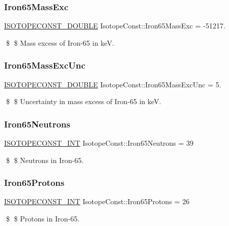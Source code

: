 \subsubsection{\texorpdfstring{Iron65\+Mass\+Exc}{Iron65MassExc}}
{\footnotesize\ttfamily \mbox{\hyperlink{group___isotope_const-_macros_ga8f45a7272ce02c0b4c65c44636ed719a}{I\+S\+O\+T\+O\+P\+E\+C\+O\+N\+S\+T\+\_\+\+D\+O\+U\+B\+LE}} Isotope\+Const\+::\+Iron65\+Mass\+Exc = -\/51217.}

\$ \$ Mass excess of Iron-\/65 in keV. \mbox{\label{group___isotope_const-_iron-_fe65_ga433e1e21e941b3355f8ce57d3cc3d229}} 
\subsubsection{\texorpdfstring{Iron65\+Mass\+Exc\+Unc}{Iron65MassExcUnc}}
{\footnotesize\ttfamily \mbox{\hyperlink{group___isotope_const-_macros_ga8f45a7272ce02c0b4c65c44636ed719a}{I\+S\+O\+T\+O\+P\+E\+C\+O\+N\+S\+T\+\_\+\+D\+O\+U\+B\+LE}} Isotope\+Const\+::\+Iron65\+Mass\+Exc\+Unc = 5.}

\$ \$ Uncertainty in mass excess of Iron-\/65 in keV. \mbox{\label{group___isotope_const-_iron-_fe65_gad036cc195e1c9a774f90473e7738ec2a}} 
\subsubsection{\texorpdfstring{Iron65\+Neutrons}{Iron65Neutrons}}
{\footnotesize\ttfamily \mbox{\hyperlink{group___isotope_const-_macros_ga5f18360b3e99483a35c32d789e62621c}{I\+S\+O\+T\+O\+P\+E\+C\+O\+N\+S\+T\+\_\+\+I\+NT}} Isotope\+Const\+::\+Iron65\+Neutrons = 39}

\$ \$ Neutrons in Iron-\/65. \mbox{\label{group___isotope_const-_iron-_fe65_gad245a0287db4bf30a0a0d534c1010e5b}} 
\subsubsection{\texorpdfstring{Iron65\+Protons}{Iron65Protons}}
{\footnotesize\ttfamily \mbox{\hyperlink{group___isotope_const-_macros_ga5f18360b3e99483a35c32d789e62621c}{I\+S\+O\+T\+O\+P\+E\+C\+O\+N\+S\+T\+\_\+\+I\+NT}} Isotope\+Const\+::\+Iron65\+Protons = 26}

\$ \$ Protons in Iron-\/65. 